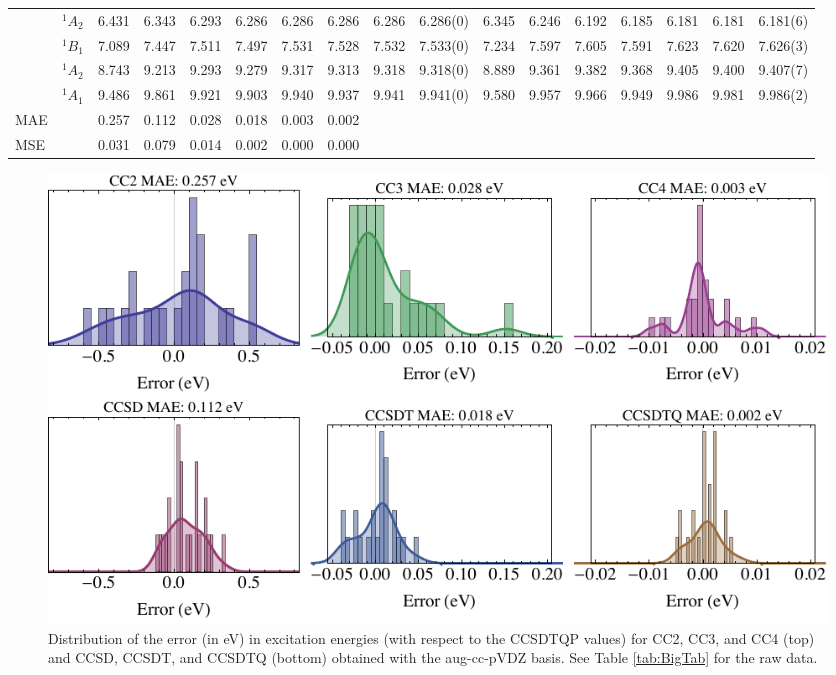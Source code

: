\documentclass[aip,jcp,reprint,noshowkeys,superscriptaddress]{revtex4-1}
\begin{document}
\begin{squeezetable}
\begin{table}
\begin{ruledtabular}
\begin{tabular}{llrrrrrrrrrrrrrrr}
				&	$^1A_2$  		&6.431	&6.343	&6.293	&6.286	&6.286	&6.286	&6.286	&6.286(0)	&6.345	&6.246	&6.192	&6.185	&6.181	&6.181	&6.181(6) \\
	\ce{H2O}	&	$^1B_1$  		&7.089	&7.447	&7.511	&7.497	&7.531	&7.528	&7.532	&7.533(0)	&7.234	&7.597	&7.605	&7.591	&7.623	&7.620	&7.626(3)\\
				&	$^1A_2$  		&8.743	&9.213	&9.293	&9.279	&9.317	&9.313	&9.318	&9.318(0)	&8.889	&9.361	&9.382	&9.368	&9.405	&9.400	&9.407(7)\\
				&	$^1A_1$  		&9.486	&9.861	&9.921	&9.903	&9.940	&9.937	&9.941	&9.941(0)	&9.580	&9.957	&9.966	&9.949	&9.986	&9.981	&9.986(2)\\
	\hline
	MAE			&					&0.257	&0.112	&0.028	&0.018	&0.003	&0.002	\\
	MSE			&					&0.031	&0.079	&0.014	&0.002	&0.000	&0.000	\\
	\end{tabular}
	\end{ruledtabular}
\end{table}
\end{squeezetable}

\begin{figure}
	\includegraphics[width=\linewidth]{histograms_MAE_AVDZ}
	\caption{
	Distribution of the error (in eV) in excitation energies (with respect to the CCSDTQP values) for CC2, CC3, and CC4 (top) and CCSD, CCSDT, and CCSDTQ (bottom) obtained with the aug-cc-pVDZ basis.
	See Table \ref{tab:BigTab} for the raw data.
	\label{fig:error}}
\end{figure}
\end{document}
